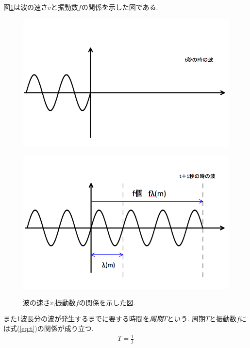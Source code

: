 図\ref{fig:vft}は波の速さ$v$と振動数$f$の関係を示した図である.
\begin{figure}[htbp]
\begin{minipage}[b]{1.0\linewidth}
\centering
\includegraphics[keepaspectratio, scale=0.42]
  {../background/tminute2.png}
 \label{tminute}
 \end{minipage}
 
\begin{minipage}[b]{1.0\linewidth}
\centering
  \includegraphics[keepaspectratio, scale=0.42]
  {../background/t+1minute2.png}
 \label{t+1minute}
 \end{minipage}
  
  \caption{波の速さ$v$,振動数$f$の関係を示した図.}
 \label{fig:vft}
\end{figure}

また1波長分の波が発生するまでに要する時間を\emph{周期$T$}という.
周期$T$と振動数$f$には式(\ref{eq:t})の関係が成り立つ.
\begin{eqnarray}
\label{eq:t}
T = \frac{1}{f}
\end{eqnarray}


